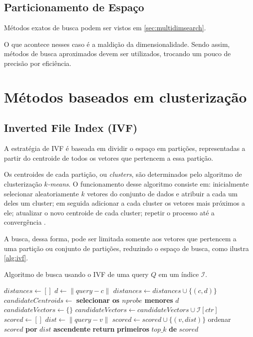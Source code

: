\subsection{Particionamento de Espaço}

Métodos exatos de busca podem ser vistos em \cref{sec:multidimsearch}.

O que acontece nesses caso é a maldição da dimensionalidade. Sendo assim, métodos de busca aproximados devem ser utilizados, trocando um pouco de precisão por eficiência.

\section{Métodos baseados em clusterização}

\subsection{Inverted File Index (IVF)}

A estratégia de IVF é baseada em dividir o espaço em partições, representadas a partir do centroide de todos os vetores que pertencem a essa partição.

Os centroides de cada partição, ou \textit{clusters}, são determinados pelo algoritmo de clusterização \textit{$k$-means}. O funcionamento desse algoritmo consiste em: inicialmente selecionar aleatoriamente $k$ vetores do conjunto de dados e atribuir a cada um deles um cluster; em seguida adicionar a cada cluster os vetores mais próximos a ele; atualizar o novo centroide de cada cluster; repetir o processo até a convergência \cite{kmeans:wiki, lloydsalg:wiki}.

A busca, dessa forma, pode ser limitada somente aos vetores que pertencem a uma partição ou conjunto de partições, reduzindo o espaço de busca, como ilustra \cref{alg:ivf}.

\begin{algorithm}
\caption{Algoritmo de busca usando o IVF de uma query $Q$ em um índice $\mathcal{I}$.}
\label{alg:ivf}
\begin{algorithmic}[1]
    \State $distances \gets []$
        \State $d \gets \|query - c\|$
        \State $distances \gets distances \cup \{(c, d)\}$
    \EndFor
    \State $candidateCentroids \gets$ \textbf{selecionar os $nprobe$ menores} $d$
    \State $candidateVectors \gets \{\}$
        \State $candidateVectors \gets candidateVectors \cup \mathcal{I}[ctr]$
    \EndFor
    \State $scored \gets []$
        \State $dist \gets \|query - v\|$
        \State $scored \gets scored \cup \{(v, dist)\}$
    \EndFor
    \State ordenar $scored$ \textbf{por} $dist$ \textbf{ascendente}
    \State \textbf{return} \textbf{primeiros} $top\_k$ \textbf{de} $scored$
\EndProcedure
\end{algorithmic}
\end{algorithm}


